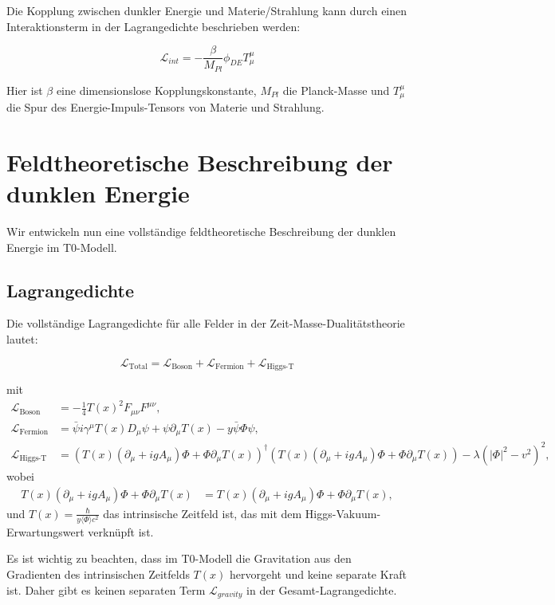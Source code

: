 \documentclass[a4paper,12pt]{article}
\theoremstyle{definition}
\theoremstyle{remark}
\newcommand{\Tfield}{T(x)}
\newcommand{\DhiggsTdef}{\Tfield (\partial_\mu + ig A_\mu) \Phi + \Phi \partial_\mu \Tfield}
\newcommand{\DcovT}[1]{\Tfield D_\mu #1 + #1 \partial_\mu \Tfield}
\begin{document}
	Die Kopplung zwischen dunkler Energie und Materie/Strahlung kann durch einen Interaktionsterm in der Lagrangedichte beschrieben werden:
	
	\begin{equation}
		\mathcal{L}_{int} = -\frac{\beta}{M_{Pl}} \phi_{DE} T^{\mu}_{\mu}
	\end{equation}
	
	Hier ist $\beta$ eine dimensionslose Kopplungskonstante, $M_{Pl}$ die Planck-Masse und $T^{\mu}_{\mu}$ die Spur des Energie-Impuls-Tensors von Materie und Strahlung.
	
	\section{Feldtheoretische Beschreibung der dunklen Energie}
	Wir entwickeln nun eine vollständige feldtheoretische Beschreibung der dunklen Energie im T0-Modell.
	
	\subsection{Lagrangedichte}
	Die vollständige Lagrangedichte für alle Felder in der Zeit-Masse-Dualitätstheorie lautet:
	
	\begin{equation}
		\mathcal{L}_{\text{Total}} = \mathcal{L}_{\text{Boson}} + \mathcal{L}_{\text{Fermion}} + \mathcal{L}_{\text{Higgs-T}}
	\end{equation}
	
	mit
	\begin{align}
		\mathcal{L}_{\text{Boson}} &= -\frac{1}{4} \Tfield^2 F_{\mu\nu} F^{\mu\nu}, \\
		\mathcal{L}_{\text{Fermion}} &= \bar{\psi} i \gamma^\mu \DcovT{\psi} - y \bar{\psi} \Phi \psi, \\
		\mathcal{L}_{\text{Higgs-T}} &= (\DhiggsTdef)^\dagger (\DhiggsTdef) - \lambda (|\Phi|^2 - v^2)^2,
	\end{align}
	wobei
	\begin{align}
		\DhiggsTdef &= \Tfield (\partial_\mu + ig A_\mu) \Phi + \Phi \partial_\mu \Tfield,
	\end{align}
	und $\Tfield = \frac{\hbar}{y \langle \Phi \rangle c^2}$ das intrinsische Zeitfeld ist, das mit dem Higgs-Vakuum-Erwartungswert verknüpft ist.
	
	Es ist wichtig zu beachten, dass im T0-Modell die Gravitation aus den Gradienten des intrinsischen Zeitfelds $\Tfield$ hervorgeht und keine separate Kraft ist. Daher gibt es keinen separaten Term $\mathcal{L}_{gravity}$ in der Gesamt-Lagrangedichte.
	
\end{document}
